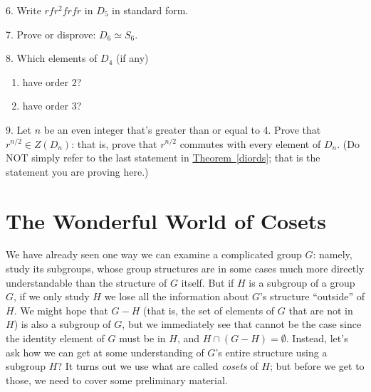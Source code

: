 \documentclass[10pt,]{book}
\theoremstyle{plain}
\theoremstyle{definition}
\theoremstyle{definition}
\theoremstyle{definition}
\theoremstyle{definition}
\numberwithin{equation}{section}
\begin{document}
\begin{exerciselist}
\begin{enumerate}[label=(\alph*)]
\end{enumerate}
%
\par\smallskip
\item[6.]\hypertarget{exercise-46}{}Write \(rfr^2frfr\) in \(D_5\) in standard form.%
\par\smallskip
\item[7.]\hypertarget{exercise-47}{}Prove or disprove: \(D_6\simeq S_6\).%
\par\smallskip
\item[8.]\hypertarget{exercise-48}{}Which elements of \(D_4\) (if any) \leavevmode%
\begin{enumerate}[label=(\alph*)]
\item\hypertarget{li-371}{}have order 2?%
\item\hypertarget{li-372}{}have order \(3\)?%
\end{enumerate}
%
\par\smallskip
\item[9.]\hypertarget{exercise-49}{}Let \(n\) be an even integer that's greater than or equal to 4. Prove that \(r^{n/2}\in Z(D_n)\): that is, prove that \(r^{n/2}\) commutes with every element of \(D_n\). (Do NOT simply refer to the last statement in \hyperref[diords]{Theorem~\ref{diords}}; that is the statement you are proving here.)%
\par\smallskip
\end{exerciselist}
\typeout{************************************************}
\typeout{************************************************}
\chapter[{The Wonderful World of Cosets}]{The Wonderful World of Cosets}\label{coslag}
We have already seen one way we can examine a complicated group \(G\): namely, study its subgroups, whose group structures are in some cases much more directly understandable than the structure of \(G\) itself. But if \(H\) is a subgroup of a group \(G\), if we only study \(H\) we lose all the information about \(G\)'s structure ``outside'' of \(H\). We might hope that \(G-H\) (that is, the set of elements of \(G\) that are not in \(H\)) is also a subgroup of \(G\), but we immediately see that cannot be the case since the identity element of \(G\) must be in \(H\), and \(H\cap (G-H)=\emptyset\). Instead, let's ask how we can get at some understanding of \(G\)'s entire structure using a subgroup \(H\)? It turns out we use what are called \emph{cosets} of \(H\); but before we get to those, we need to cover some preliminary material.%
\typeout{************************************************}
\typeout{************************************************}
\end{document}
